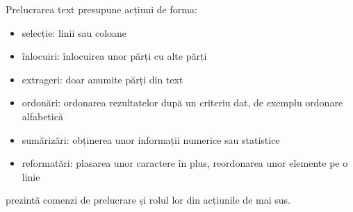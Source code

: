 Prelucrarea text presupune acțiuni de forma:

\begin{itemize}
	\item selecție: linii sau coloane
	\item înlocuiri: înlocuirea unor părți cu alte părți
	\item extrageri: doar anumite părți din text
	\item ordonări: ordonarea rezultatelor după un criteriu dat, de exemplu
		ordonare alfabetică
	\item sumărizări: obținerea unor informații numerice sau statistice
	\item reformatări: plasarea unor caractere în plus, reordonarea unor
		elemente pe o linie
\end{itemize}

 prezintă comenzi de prelucrare și rolul lor din acțiunile de mai sus.

